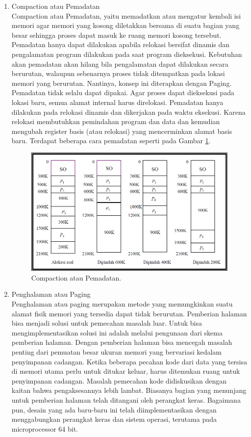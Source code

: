 \begin{enumerate}

\item Compaction atau Pemadatan\\
Compaction atau Pemadatan, yaitu memadatkan atau mengatur kembali isi memori agar memori yang kosong diletakkan bersama di suatu bagian yang besar sehingga proses dapat masuk ke ruang memori kosong tersebut. Pemadatan hanya dapat dilakukan apabila relokasi bersifat dinamis dan pengalamatan program dilakukan pada saat program dieksekusi. Kebutuhan akan pemadatan akan hilang bila pengalamatan dapat dilakukan secara berurutan, walaupun sebenarnya proses tidak ditempatkan pada lokasi memori yang berurutan. Nantinya, konsep ini diterapkan dengan Paging. Pemadatan tidak selalu dapat dipakai. Agar proses dapat dieksekusi pada lokasi baru, semua alamat internal harus direlokasi.
Pemadatan hanya dilakukan pada relokasi dinamis dan dikerjakan pada waktu eksekusi. Karena relokasi membutuhkan pemindahan program dan data dan kemudian mengubah register basis (atau relokasi) yang mencerminkan alamat basis baru. Terdapat beberapa cara pemadatan seperti pada Gambar \ref{pemadatan}.

\begin{figure}[ht]
\centerline{\includegraphics[width=1\textwidth]{figures/pemadatan.png}}
\caption{Compaction atau Pemadatan.}
\label{pemadatan}
\end{figure}


\item Penghalaman atau Paging \\
Penghalaman atau paging  merupakan metode yang memungkinkan suatu alamat fisik memori yang tersedia dapat tidak berurutan. Pemberian halaman bisa menjadi solusi untuk pemecahan masalah luar. Untuk bisa mengimplementasikan solusi ini adalah melalui pengunaan dari skema pemberian halaman. Dengan pemberian halaman bisa mencegah masalah penting dari pemuatan besar ukuran memori yang bervariasi kedalam penyimpanan cadangan. Ketika beberapa pecahan kode dari data yang tersisa di memori utama perlu untuk ditukar keluar, harus ditemukan ruang untuk penyimpanan cadangan. Masalah pemecahan kode didiskusikan dengan kaitan bahwa pengaksesannya lebih lambat. Biasanya bagian yang menunjang untuk pemberian halaman telah ditangani oleh perangkat keras. Bagaimana pun, desain yang ada baru-baru ini telah diimplementasikan dengan menggabungkan perangkat keras dan sistem operasi, terutama pada microprocessor 64 bit.


\end{enumerate}

